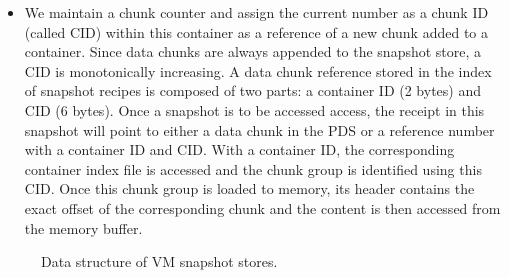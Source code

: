 \begin{itemize}
\begin{itemize}
\item We maintain  a chunk counter and assign the current number 
as a chunk ID (called CID) within this container as a reference of a new chunk added to a container. 
Since data chunks are always appended to the snapshot store, 
 a CID is monotonically increasing.
A data chunk reference stored in the index of snapshot recipes
is composed of two parts: a container ID (2 bytes) and CID (6 bytes).
Once a snapshot is to be accessed access, the receipt in this snapshot will point to either a data chunk
in the PDS or a reference number with a container ID and CID.
With a container ID, the corresponding container index file is accessed and 
the chunk group is identified using this CID. Once this chunk group is loaded to memory, its header contains the exact offset of the corresponding chunk and the content is then accessed from the memory buffer.

	\end{itemize}
\end{itemize}


 


\begin{figure}[htbp]
  \centering
  \caption{Data structure of VM snapshot stores.}
  \label{fig:as_arch}
\end{figure}

